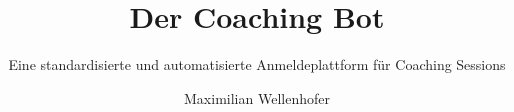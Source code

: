 \documentclass[envcountsame, envcountchap, deutsch]{i-studis} %
\begin{document}
\title{Der Coaching Bot}
\subtitle{Eine standardisierte und automatisierte Anmeldeplattform für Coaching Sessions}

\author{Maximilian Wellenhofer}


\address{Zürich}


\mytitlepage

\frontmatter
\tableofcontents										%
\listoffigures											%
\listoftables											%
\lstlistoflistings										%


\mainmatter











\backmatter
\printindex												%


\begin{appendix}
\end{appendix}
\end{document}
